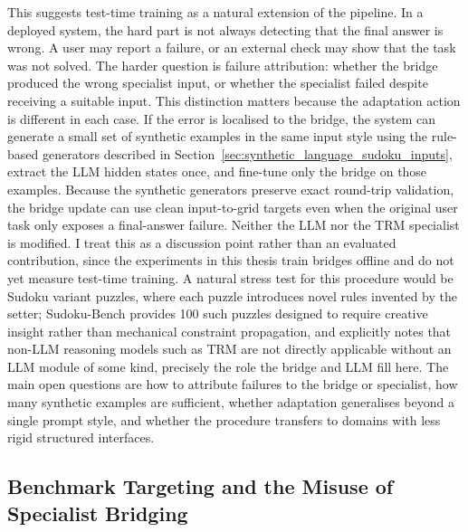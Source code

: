 \documentclass[11pt]{article}
\begin{document}
This suggests test-time training as a natural extension of the pipeline.
In a deployed system, the hard part is not always detecting that the final answer is wrong.
A user may report a failure, or an external check may show that the task was not solved.
The harder question is failure attribution: whether the bridge produced the wrong specialist input, or whether the specialist failed despite receiving a suitable input.
This distinction matters because the adaptation action is different in each case.
If the error is localised to the bridge, the system can generate a small set of synthetic examples in the same input style using the rule-based generators described in Section~\ref{sec:synthetic_language_sudoku_inputs}, extract the LLM hidden states once, and fine-tune only the bridge on those examples.
Because the synthetic generators preserve exact round-trip validation, the bridge update can use clean input-to-grid targets even when the original user task only exposes a final-answer failure.
Neither the LLM nor the TRM specialist is modified.
I treat this as a discussion point rather than an evaluated contribution, since the experiments in this thesis train bridges offline and do not yet measure test-time training.
A natural stress test for this procedure would be Sudoku variant puzzles, where each puzzle introduces novel rules invented by the setter; Sudoku-Bench \cite{seelySudokuBenchEvaluatingCreative2025} provides 100 such puzzles designed to require creative insight rather than mechanical constraint propagation, and explicitly notes that non-LLM reasoning models such as TRM are not directly applicable without an LLM module of some kind, precisely the role the bridge and LLM fill here.
The main open questions are how to attribute failures to the bridge or specialist, how many synthetic examples are sufficient, whether adaptation generalises beyond a single prompt style, and whether the procedure transfers to domains with less rigid structured interfaces.

\subsection{Benchmark Targeting and the Misuse of Specialist Bridging}
\label{sec:benchmark_overfitting}
\end{document}
